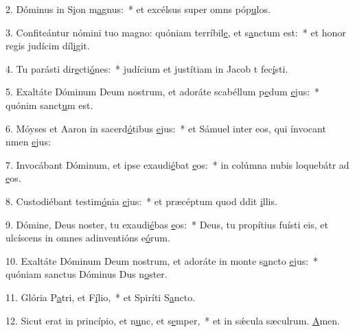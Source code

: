 2. Dóminus in S\uline{i}on m\uline{a}gnus:~* et excélsus super omns póp\uline{u}los.\par 
3. Confiteántur nómini tuo magno: quóniam terríbil\uline{e}, et s\uline{a}nctum est:~* et honor regis judícim díl\uline{i}git.\par 
4. Tu parásti dir\uline{e}cti\uline{ó}nes:~* judícium et justítiam in Jacob t fec\uline{í}sti.\par 
5. Exaltáte Dóminum Deum nostrum, et adoráte scabéllum p\uline{e}dum \uline{e}jus:~* quónim sanct\uline{u}m est.\par 
6. Móyses et Aaron in sacerd\uline{ó}tibus \uline{e}jus:~* et Sámuel inter eos, qui ínvocant nmen \uline{e}jus:\par 
7. Invocábant Dóminum, et ipse exaudi\uline{é}bat \uline{e}os:~* in colúmna nubis loquebátr ad \uline{e}os.\par 
8. Custodiébant testim\uline{ó}nia \uline{e}jus:~* et præcéptum quod ddit \uline{i}llis.\par 
9. Dómine, Deus noster, tu exaudi\uline{é}bas \uline{e}os:~* Deus, tu propítius fuísti eis, et ulcíscens in omnes adinventións e\uline{ó}rum.\par 
10. Exaltáte Dóminum Deum nostrum, et adoráte in monte s\uline{a}ncto \uline{e}jus:~* quóniam sanctus Dóminus Dus n\uline{o}ster.\par 
11. Glória P\uline{a}tri, et F\uline{í}lio,~* et Spiríti S\uline{a}ncto.\par 
12. Sicut erat in princípio, et n\uline{u}nc, et s\uline{e}mper,~* et in sǽcula sæculrum. \uline{A}men.\par 

